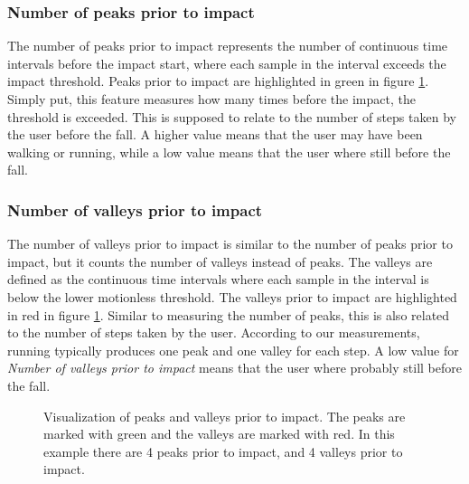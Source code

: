 \documentclass[12pt, a4paper, onecolumn]{article}
\begin{document}
	\subsubsection{Number of peaks prior to impact}
	
	The number of peaks prior to impact represents the number of continuous time intervals before the impact start, where each sample in the interval exceeds the impact threshold. Peaks prior to impact are highlighted in green in figure \ref{fig:fall-data-peaks-and-valleys}. Simply put, this feature measures how many times before the impact, the threshold is exceeded. This is supposed to relate to the number of steps taken by the user before the fall. A higher value means that the user may have been walking or running, while a low value means that the user where still before the fall.
	
	\subsubsection{Number of valleys prior to impact}
	
	The number of valleys prior to impact is similar to the number of peaks prior to impact, but it counts the number of valleys instead of peaks. The valleys are defined as the continuous time intervals where each sample in the interval is below the lower motionless threshold. The valleys prior to impact are highlighted in red in figure \ref{fig:fall-data-peaks-and-valleys}. Similar to measuring the number of peaks, this is also related to the number of steps taken by the user. According to our measurements, running typically produces one peak and one valley for each step. A low value for \textit{Number of valleys prior to impact} means that the user where probably still before the fall.
	
	\begin{figure}[H]
		\centering
		\caption{Visualization of peaks and valleys prior to impact. The peaks are marked with green and the valleys are marked with red. In this example there are 4 peaks prior to impact, and 4 valleys prior to impact.}%
		\label{fig:fall-data-peaks-and-valleys}%
	\end{figure}
	
\end{document}
